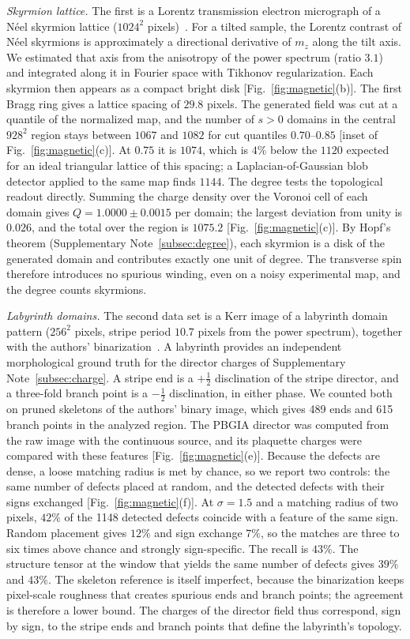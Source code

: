 \documentclass[11pt,a4paper]{article}
\begin{document}
\emph{Skyrmion lattice.} The first is a Lorentz transmission electron micrograph of a N\'eel skyrmion lattice ($1024^2$ pixels)~\cite{McCray2024}. For a tilted sample, the Lorentz contrast of N\'eel skyrmions is approximately a directional derivative of $m_z$ along the tilt axis. We estimated that axis from the anisotropy of the power spectrum (ratio $3.1$) and integrated along it in Fourier space with Tikhonov regularization. Each skyrmion then appears as a compact bright disk [Fig.~\ref{fig:magnetic}(b)]. The first Bragg ring gives a lattice spacing of $29.8$ pixels. The generated field was cut at a quantile of the normalized map, and the number of $s>0$ domains in the central $928^2$ region stays between $1067$ and $1082$ for cut quantiles $0.70$--$0.85$ [inset of Fig.~\ref{fig:magnetic}(c)]. At $0.75$ it is $1074$, which is $4\%$ below the $1120$ expected for an ideal triangular lattice of this spacing; a Laplacian-of-Gaussian blob detector applied to the same map finds $1144$. The degree tests the topological readout directly. Summing the charge density over the Voronoi cell of each domain gives $Q=1.0000\pm0.0015$ per domain; the largest deviation from unity is $0.026$, and the total over the region is $1075.2$ [Fig.~\ref{fig:magnetic}(c)]. By Hopf's theorem (Supplementary Note~\ref{subsec:degree}), each skyrmion is a disk of the generated domain and contributes exactly one unit of degree. The transverse spin therefore introduces no spurious winding, even on a noisy experimental map, and the degree counts skyrmions.

\emph{Labyrinth domains.} The second data set is a Kerr image of a labyrinth domain pattern ($256^2$ pixels, stripe period $10.7$ pixels from the power spectrum), together with the authors' binarization~\cite{Zhao2026}. A labyrinth provides an independent morphological ground truth for the director charges of Supplementary Note~\ref{subsec:charge}. A stripe end is a $+\tfrac12$ disclination of the stripe director, and a three-fold branch point is a $-\tfrac12$ disclination, in either phase. We counted both on pruned skeletons of the authors' binary image, which gives 489 ends and 615 branch points in the analyzed region. The PBGIA director was computed from the raw image with the continuous source, and its plaquette charges were compared with these features [Fig.~\ref{fig:magnetic}(e)]. Because the defects are dense, a loose matching radius is met by chance, so we report two controls: the same number of defects placed at random, and the detected defects with their signs exchanged [Fig.~\ref{fig:magnetic}(f)]. At $\sigma=1.5$ and a matching radius of two pixels, $42\%$ of the 1148 detected defects coincide with a feature of the same sign. Random placement gives $12\%$ and sign exchange $7\%$, so the matches are three to six times above chance and strongly sign-specific. The recall is $43\%$. The structure tensor at the window that yields the same number of defects gives $39\%$ and $43\%$. The skeleton reference is itself imperfect, because the binarization keeps pixel-scale roughness that creates spurious ends and branch points; the agreement is therefore a lower bound. The charges of the director field thus correspond, sign by sign, to the stripe ends and branch points that define the labyrinth's topology.
\end{document}
